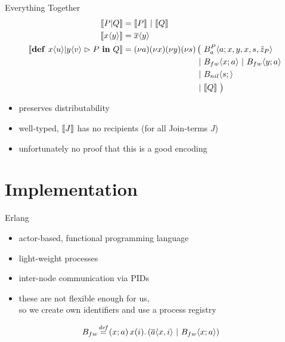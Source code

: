 \documentclass[]{beamer}
\begin{document}
    \begin{frame}{Everything Together}
      \begin{align*}
        \encMJtoAP{P \jpar Q}
        &= \encMJtoAP{P} \apar \encMJtoAP{Q}
        \\
        \encMJtoAP{\jsnd{x}{y}}
        &= \asnd{x}{y}
        \\
        \encMJtoAP{\jdef{\jrct{\jrcv{x}{u} \jpat \jrcv{y}{v}}{P}}{Q}}
        &= \anew{a}{\anew{x}{\anew{y}{\anew{s}{
          \begin{aligned}[t]
            \big(\ &\ains{B_a^P}{a}{x, y, x, s, \tilde{z}_P} \\
            \apar  &\ains{B_{fw}}{x}{a} \apar \ains{B_{fw}}{y}{a} \\
            \apar  &\ains{B_{nil}}{s}{} \\
            \apar  &\encMJtoAP{Q}
            \ \big)
          \end{aligned}
        }}}}
      \end{align*}
      \pause
      \begin{itemize}
        \item preserves distributability
        \item well-typed, $\llbracket J \rrbracket$ has no recipients (for all Join-terms $J$)
        \item unfortunately no proof that this is a good encoding
      \end{itemize}
    \end{frame}

  \section{Implementation}

    \begin{frame}{Erlang}
      \begin{itemize}
        \item actor-based, functional programming language
        \item light-weight processes
        \item inter-node communication via PIDs
        \item these are not flexible enough for us,\\
          so we create own identifiers and use a process registry
      \end{itemize}
    \end{frame}

    \begin{frame}{}
      \begin{align*}
        \adef*{B_{fw}}{x}{a}{\arcv{x}{i} . \parens{\asnd{a}{x,i} \apar \ains{B_{fw}}{x}{a}}}
      \end{align*}
    \end{frame}
\end{document}
